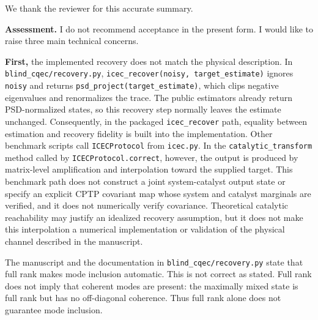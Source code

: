 \documentclass[11pt,a4paper]{article}
\newcommand{\rev}[1]{{\color{black}#1}}
\newcommand{\resp}[1]{{\color{red}#1}}
\begin{document}
\resp{We thank the reviewer for this accurate summary.}

\rev{\textbf{Assessment.} I do not recommend acceptance in the present form. I would like to raise three main technical concerns.}

\rev{\textbf{First,} the implemented recovery does not match the physical description. In \texttt{blind\_cqec/recovery.py}, \texttt{icec\_recover(noisy, target\_estimate)} ignores \texttt{noisy} and returns \texttt{psd\_project(target\_estimate)}, which clips negative eigenvalues and renormalizes the trace. The public estimators already return PSD-normalized states, so this recovery step normally leaves the estimate unchanged. Consequently, in the packaged \texttt{icec\_recover} path, equality between estimation and recovery fidelity is built into the implementation. Other benchmark scripts call \texttt{ICECProtocol} from \texttt{icec.py}. In the \texttt{catalytic\_transform} method called by \texttt{ICECProtocol.correct}, however, the output is produced by matrix-level amplification and interpolation toward the supplied target. This benchmark path does not construct a joint system-catalyst output state or specify an explicit CPTP covariant map whose system and catalyst marginals are verified, and it does not numerically verify covariance. Theoretical catalytic reachability may justify an idealized recovery assumption, but it does not make this interpolation a numerical implementation or validation of the physical channel described in the manuscript.}

\rev{The manuscript and the documentation in \texttt{blind\_cqec/recovery.py} state that full rank makes mode inclusion automatic. This is not correct as stated. Full rank does not imply that coherent modes are present: the maximally mixed state is full rank but has no off-diagonal coherence. Thus full rank alone does not guarantee mode inclusion.}
\end{document}
